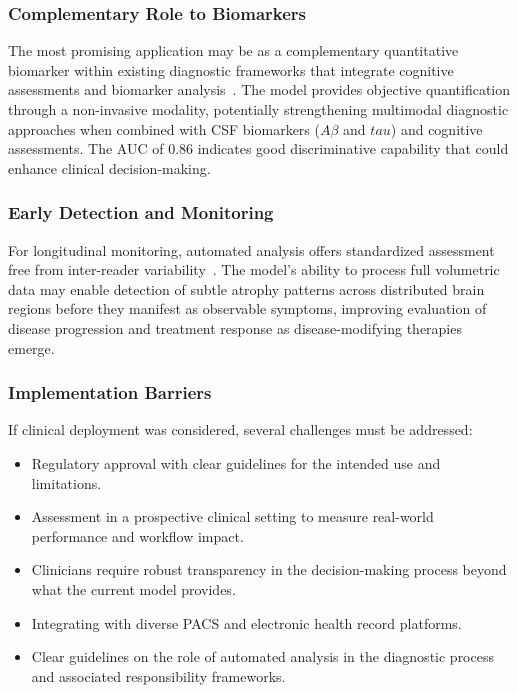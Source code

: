 \documentclass[12pt, a4paper]{article}
\begin{document}
\subsubsection{Complementary Role to Biomarkers}

The most promising application may be as a complementary quantitative biomarker within existing diagnostic frameworks that integrate cognitive assessments and biomarker analysis~\cite{dubois2007research}. The model provides objective quantification through a non-invasive modality, potentially strengthening multimodal diagnostic approaches when combined with CSF biomarkers ($A\beta$ and $tau$) and cognitive assessments. The AUC of 0.86 indicates good discriminative capability that could enhance clinical decision-making.

\subsubsection{Early Detection and Monitoring}

For longitudinal monitoring, automated analysis offers standardized assessment free from inter-reader variability~\cite{kloppel2008accuracy}. The model's ability to process full volumetric data may enable detection of subtle atrophy patterns across distributed brain regions before they manifest as observable symptoms, improving evaluation of disease progression and treatment response as disease-modifying therapies emerge.

\subsubsection{Implementation Barriers}

If clinical deployment was considered, several challenges must be addressed:

\begin{itemize}
  \item Regulatory approval with clear guidelines for the intended use and limitations.
  
  \item Assessment in a prospective clinical setting to measure real-world performance and workflow impact.
  
  \item Clinicians require robust transparency in the decision-making process beyond what the current model provides.
  
  \item Integrating with diverse PACS and electronic health record platforms.
  
  \item Clear guidelines on the role of automated analysis in the diagnostic process and associated responsibility frameworks.
\end{itemize}
\end{document}
